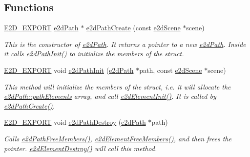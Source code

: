 \subsection*{Functions}
\begin{DoxyCompactItemize}
\item 
\hyperlink{Ez2DS_8h_a9f14e9cb869e1a85fdaba03afcca0df9}{E2\-D\-\_\-\-E\-X\-P\-O\-R\-T} \hyperlink{structe2dPath}{e2d\-Path} $\ast$ \hyperlink{group__e2dPath_gaceacae85646a55f26e71461fe1bf657e}{e2d\-Path\-Create} (const \hyperlink{structe2dScene}{e2d\-Scene} $\ast$scene)
\begin{DoxyCompactList}\small\item\em This is the constructor of \hyperlink{structe2dPath}{e2d\-Path}. It returns a pointer to a new \hyperlink{structe2dPath}{e2d\-Path}. Inside it calls \hyperlink{group__e2dPath_ga0198f755666444a1b37ce5ed7c34cb1e}{e2d\-Path\-Init()} to initialize the members of the struct. \end{DoxyCompactList}\item 
\hyperlink{Ez2DS_8h_a9f14e9cb869e1a85fdaba03afcca0df9}{E2\-D\-\_\-\-E\-X\-P\-O\-R\-T} void \hyperlink{group__e2dPath_ga0198f755666444a1b37ce5ed7c34cb1e}{e2d\-Path\-Init} (\hyperlink{structe2dPath}{e2d\-Path} $\ast$path, const \hyperlink{structe2dScene}{e2d\-Scene} $\ast$scene)
\begin{DoxyCompactList}\small\item\em This method will initialize the members of the struct, i.\-e. it will allocate the \hyperlink{structe2dPath_ac0c8a45ff4f8d02e557fb33887743439}{e2d\-Path\-::path\-Elements} array, and call \hyperlink{group__e2dElement_ga8734d10ef40a380dfc51bfe1790a92a7}{e2d\-Element\-Init()}. It is called by \hyperlink{group__e2dPath_gaceacae85646a55f26e71461fe1bf657e}{e2d\-Path\-Create()}. \end{DoxyCompactList}\item 
\hyperlink{Ez2DS_8h_a9f14e9cb869e1a85fdaba03afcca0df9}{E2\-D\-\_\-\-E\-X\-P\-O\-R\-T} void \hyperlink{group__e2dPath_ga96b9669138ff5e22422e5e1fa29d41d1}{e2d\-Path\-Destroy} (\hyperlink{structe2dPath}{e2d\-Path} $\ast$path)
\begin{DoxyCompactList}\small\item\em Calls \hyperlink{group__e2dPath_ga4df45661b4e01f38925a541f91ede422}{e2d\-Path\-Free\-Members()}, \hyperlink{group__e2dElement_ga5c3a7d29f41609686a3a455bad6ef7c9}{e2d\-Element\-Free\-Members()}, and then frees the pointer. \hyperlink{group__e2dElement_ga2fdc3435e0e1ac9d1e1f0b330d9539fa}{e2d\-Element\-Destroy()} will call this method. \end{DoxyCompactList}\item 

\end{DoxyCompactItemize}
